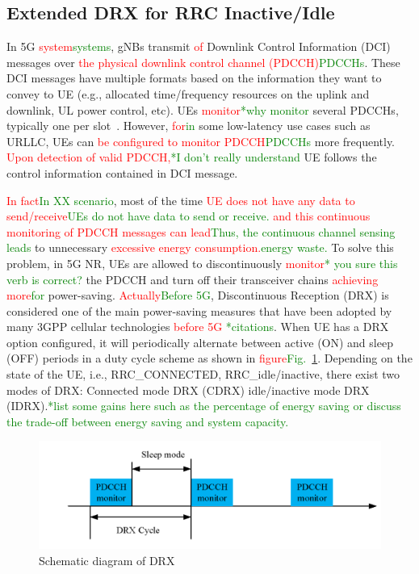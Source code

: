 \documentclass[]{IEEEtran}
\newcommand{\CAREPL}[2]{\textcolor{red}{#1}\textcolor{green}{#2}}
\begin{document}
\subsection{Extended DRX for RRC Inactive/Idle}
\label{sec:5-1}

In 5G \CAREPL{system}{systems}, gNBs transmit \CAREPL{of}{} Downlink Control Information (DCI) messages over \CAREPL{the physical downlink control channel (PDCCH)}{PDCCHs}. 
These DCI messages have multiple formats based on the information they want to convey to UE (e.g., allocated time/frequency resources on the uplink and downlink, UL power control, etc). 
UEs \CAREPL{monitor}{*why monitor} several PDCCHs, typically one per slot~\cite{3gpp_release_2019_21.915}. 
However, \CAREPL{for}{in} some low-latency use cases such as URLLC, UEs can \CAREPL{be configured to monitor}{} \CAREPL{PDCCH}{PDCCHs} more frequently. \CAREPL{Upon detection of valid PDCCH,}{*I don't really understand} UE follows the control information contained in DCI message.

\CAREPL{In fact}{In XX scenario}, most of the time \CAREPL{UE does not have any data to send/receive}{UEs do not have data to send or receive.} \CAREPL{and this continuous monitoring of PDCCH messages can lead}{Thus, the continuous channel sensing leads} to unnecessary \CAREPL{excessive energy consumption.}{energy waste.} 
To solve this problem, in 5G NR, UEs are allowed to discontinuously \CAREPL{monitor}{* you sure this verb is correct?} the PDCCH and turn off their transceiver chains \CAREPL{achieving more}{for} power-saving. 
\CAREPL{Actually}{Before 5G}, Discontinuous Reception (DRX) is considered one of the main power-saving measures that have been adopted by many 3GPP cellular technologies \CAREPL{before 5G}{} \CAREPL{}{*citations}. 
When UE has a DRX option configured, it will periodically alternate between active (ON) and sleep (OFF) periods in a duty cycle scheme as shown in \CAREPL{figure}{Fig.~}\ref{fig:5g-drx}. 
Depending on the state of the UE, i.e., RRC\_CONNECTED, RRC\_idle/inactive, there exist two modes of DRX: Connected mode DRX (CDRX) idle/inactive mode DRX (IDRX).\CAREPL{}{*list some gains here such as the percentage of energy saving or discuss the trade-off between energy saving and system capacity.}

\begin{figure}
    \centering
    \includegraphics[width=\linewidth]{Pictures/Schematic diagram of DRX.png}
    \caption{Schematic diagram of DRX}
    \label{fig:5g-drx}
\end{figure}
\end{document}
